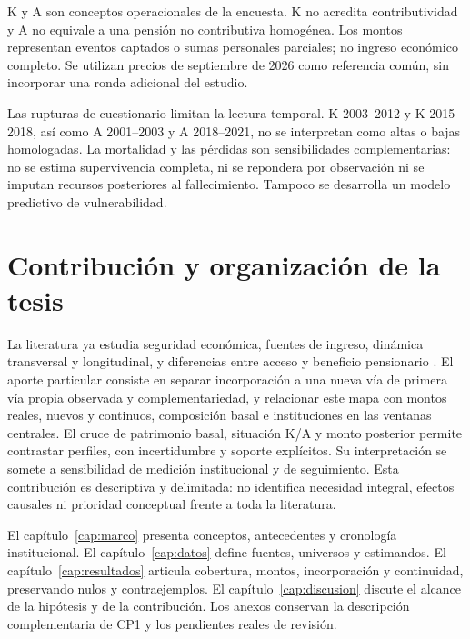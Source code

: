 K y A son conceptos operacionales de la encuesta. K no acredita
contributividad y A no equivale a una pensión no contributiva homogénea.
Los montos representan eventos captados o sumas personales parciales; no
ingreso económico completo. Se utilizan precios de septiembre de 2026 como
referencia común, sin incorporar una ronda adicional del estudio.

Las rupturas de cuestionario limitan la lectura temporal. K 2003--2012 y
K 2015--2018, así como A 2001--2003 y A 2018--2021, no se interpretan como
altas o bajas homologadas. La mortalidad y las pérdidas son sensibilidades
complementarias: no se estima supervivencia completa, ni se repondera por
observación ni se imputan recursos posteriores al fallecimiento.
Tampoco se desarrolla un modelo predictivo de vulnerabilidad.

\section{Contribución y organización de la tesis}

La literatura ya estudia seguridad económica, fuentes de ingreso,
dinámica transversal y longitudinal, y diferencias entre acceso y beneficio
pensionario \citep{degraff2018,perezarce2021,garciagarcia2025}. El aporte
particular consiste en separar incorporación a una nueva vía de primera
vía propia observada y complementariedad, y relacionar este mapa con
montos reales, nuevos y continuos, composición basal e instituciones
en las ventanas centrales. El cruce de patrimonio basal, situación K/A y monto posterior permite
contrastar perfiles, con incertidumbre y soporte explícitos. Su interpretación
se somete a sensibilidad de medición institucional y de seguimiento. Esta
contribución es descriptiva y delimitada: no identifica necesidad integral,
efectos causales ni prioridad conceptual frente a toda la literatura.

El capítulo~\ref{cap:marco} presenta conceptos, antecedentes y cronología
institucional. El capítulo~\ref{cap:datos} define fuentes, universos y
estimandos. El capítulo~\ref{cap:resultados} articula cobertura, montos,
incorporación y continuidad, preservando nulos y contraejemplos.
El capítulo~\ref{cap:discusion} discute el alcance de la hipótesis y de la
contribución. Los anexos conservan la descripción complementaria de CP1
y los pendientes reales de revisión.

